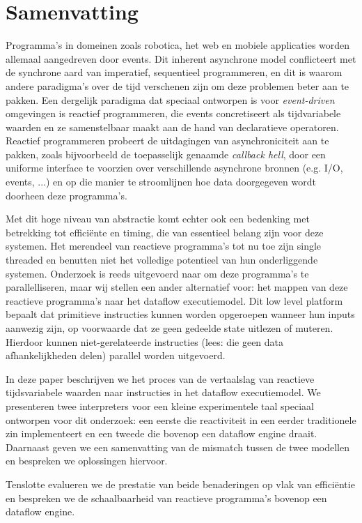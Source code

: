 \section*{Samenvatting}

Programma's in domeinen zoals robotica, het web en mobiele applicaties worden allemaal aangedreven door events. Dit inherent asynchrone model conflicteert met de synchrone aard van imperatief, sequentieel programmeren, en dit is waarom andere paradigma's over de tijd verschenen zijn om deze problemen beter aan te pakken. Een dergelijk paradigma dat speciaal ontworpen is voor \textit{event-driven} omgevingen is reactief programmeren, die events concretiseert als tijdvariabele waarden en ze samenstelbaar maakt aan de hand van declaratieve operatoren. Reactief programmeren probeert de uitdagingen van asynchroniciteit aan te pakken, zoals bijvoorbeeld de toepasselijk genaamde \textit{callback hell}, door een uniforme interface te voorzien over verschillende asynchrone bronnen (e.g. I/O, events, ...) en op die manier te stroomlijnen hoe data doorgegeven wordt doorheen deze programma's.

Met dit hoge niveau van abstractie komt echter ook een bedenking met betrekking tot efficiënte en timing, die van essentieel belang zijn voor deze systemen. Het merendeel van reactieve programma's tot nu toe zijn single threaded en benutten niet het volledige potentieel van hun onderliggende systemen. Onderzoek is reeds uitgevoerd naar om deze programma's te parallelliseren, maar wij stellen een ander alternatief voor: het mappen van deze reactieve programma's naar het dataflow executiemodel. Dit low level platform bepaalt dat primitieve instructies kunnen worden opgeroepen wanneer hun inputs aanwezig zijn, op voorwaarde dat ze geen gedeelde state uitlezen of muteren. Hierdoor kunnen niet-gerelateerde instructies (lees: die geen data afhankelijkheden delen) parallel worden uitgevoerd.

In deze paper beschrijven we het proces van de vertaalslag van reactieve tijdsvariabele waarden naar instructies in het dataflow executiemodel. We presenteren twee interpreters voor een kleine experimentele taal speciaal ontworpen voor dit onderzoek: een eerste die reactiviteit in een eerder traditionele zin implementeert en een tweede die bovenop een dataflow engine draait. Daarnaast geven we een samenvatting van de mismatch tussen de twee modellen en bespreken we oplossingen hiervoor.

Tenslotte evalueren we de prestatie van beide benaderingen op vlak van efficiëntie en bespreken we de schaalbaarheid van reactieve programma's bovenop een dataflow engine. 
